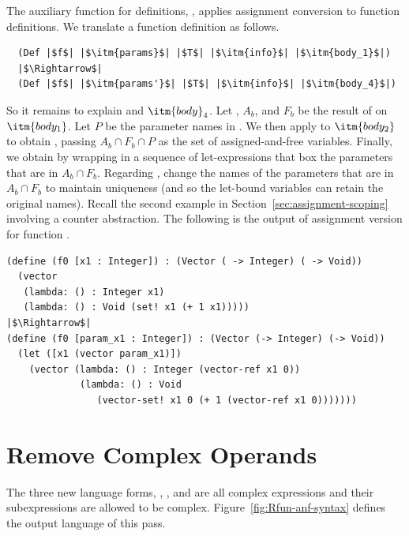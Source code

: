 \documentclass[11pt]{book}
\begin{document}
The auxiliary function for definitions, ,
applies assignment conversion to function definitions.
We translate a function definition as follows.
\begin{lstlisting}
  (Def |$f$| |$\itm{params}$| |$T$| |$\itm{info}$| |$\itm{body_1}$|)
  |$\Rightarrow$|
  (Def |$f$| |$\itm{params'}$| |$T$| |$\itm{info}$| |$\itm{body_4}$|)
\end{lstlisting}
So it remains to explain  and $\itm{body}_4$.
Let , $A_b$, and $F_b$ be the result of
 on $\itm{body_1}$.
Let $P$ be the parameter names in .
We then apply  to $\itm{body_2}$ to
obtain , passing $A_b \cap F_b \cap P$
as the set of assigned-and-free variables.
Finally, we obtain  by wrapping 
in a sequence of let-expressions that box the parameters
that are in $A_b \cap F_b$.
%
Regarding , change the names of the parameters that are
in $A_b \cap F_b$ to maintain uniqueness (and so the let-bound
variables can retain the original names). Recall the second example in
Section~\ref{sec:assignment-scoping} involving a counter
abstraction. The following is the output of assignment version for
function .
\begin{lstlisting}
(define (f0 [x1 : Integer]) : (Vector ( -> Integer) ( -> Void))
  (vector
   (lambda: () : Integer x1)
   (lambda: () : Void (set! x1 (+ 1 x1)))))
|$\Rightarrow$|
(define (f0 [param_x1 : Integer]) : (Vector (-> Integer) (-> Void))
  (let ([x1 (vector param_x1)])
    (vector (lambda: () : Integer (vector-ref x1 0))
             (lambda: () : Void
                (vector-set! x1 0 (+ 1 (vector-ref x1 0)))))))
\end{lstlisting}


\section{Remove Complex Operands}
\label{sec:rco-loop}

The three new language forms, , , and
 are all complex expressions and their subexpressions are
allowed to be complex.  Figure~\ref{fig:Rfun-anf-syntax} defines the
output language \LangFunANF{} of this pass.
\end{document}
